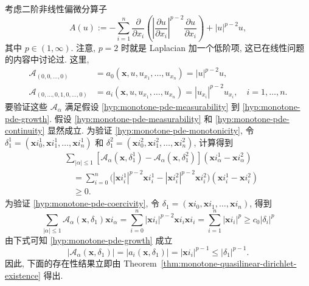 \begin{Example}
\label{ex:anisotropic-p-power-nonlinear-elliptic-operator}
考虑二阶非线性偏微分算子
\begin{equation}\label{eq:anisotropic-p-power-divergence-example}
A(u):=-\sum_{i=1}^n\dfrac{\partial}{\partial x_i}\left(\left|\dfrac{\partial u}{\partial x_i}\right|^{p-2}\dfrac{\partial u}{\partial x_i}\right)+|u|^{p-2}u,
\end{equation}
其中 $p\in(1,\infty)$. 注意, $p=2$ 时就是 Laplacian 加一个低阶项, 这已在线性问题的内容中讨论过. 这里,\[\begin{aligned}
\mathcal{A}_{(0,0,\ldots,0)}&=a_0(\bm{x},u,u_{x_1},\ldots,u_{x_n})=|u|^{p-2}u,\\
\mathcal{A}_{(0,\ldots,0,1,0,\ldots,0)}&=a_i(\bm{x},u,u_{x_1},\ldots,u_{x_n})=|u_{x_i}|^{p-2}u_{x_i},\quad i=1,\ldots,n.
\end{aligned}\]要验证这些 $\mathcal{A}_\alpha$ 满足假设 \ref{hyp:monotone-pde-measurability} 到 \ref{hyp:monotone-pde-growth}. 假设 \ref{hyp:monotone-pde-measurability} 和 \ref{hyp:monotone-pde-continuity} 显然成立. 为验证 \ref{hyp:monotone-pde-monotonicity}, 令 $\delta_1^1=(\bm{x}i_0^1,\bm{x}i_1^1,\ldots,\bm{x}i_n^1)$ 和 $\delta_1^2=(\bm{x}i_0^2,\bm{x}i_1^2,\ldots,\bm{x}i_n^2)$, 计算得到\[\begin{aligned}
&\sum_{|\alpha|\leq1}[\mathcal{A}_\alpha(\bm{x},\delta_1^1)-\mathcal{A}_\alpha(\bm{x},\delta_1^2)](\bm{x}i_\alpha^1-\bm{x}i_\alpha^2)\\
&\quad=\sum_{i=0}^n\bigl(|\bm{x}i_i^1|^{p-2}\bm{x}i_i^1-|\bm{x}i_i^2|^{p-2}\bm{x}i_i^2\bigr)(\bm{x}i_i^1-\bm{x}i_i^2)\\
&\quad\geq0.
\end{aligned}\]为验证 \ref{hyp:monotone-pde-coercivity}, 令 $\delta_1=(\bm{x}i_0,\bm{x}i_1,\ldots,\bm{x}i_n)$, 得到
\begin{equation}\label{eq:anisotropic-p-power-printed-coercivity-chain}
\sum_{|\alpha|\leq1}\mathcal{A}_\alpha(\bm{x},\delta_1)\bm{x}i_\alpha=\sum_{i=0}^n|\bm{x}i_i|^{p-2}\bm{x}i_i\bm{x}i_i=\sum_{i=1}^n|\bm{x}i_i|^p\geq c_0|\delta_i|^p
\end{equation}
由下式可知 \ref{hyp:monotone-pde-growth} 成立
\begin{equation}\label{eq:anisotropic-p-power-coefficient-growth}
|\mathcal{A}_\alpha(\bm{x},\delta_1)|=|a_i(\bm{x},\delta_1)|=|\bm{x}i_i|^{p-1}\leq|\delta_1|^{p-1}.
\end{equation}
因此, 下面的存在性结果立即由 Theorem~\ref{thm:monotone-quasilinear-dirichlet-existence} 得出.
\end{Example}

